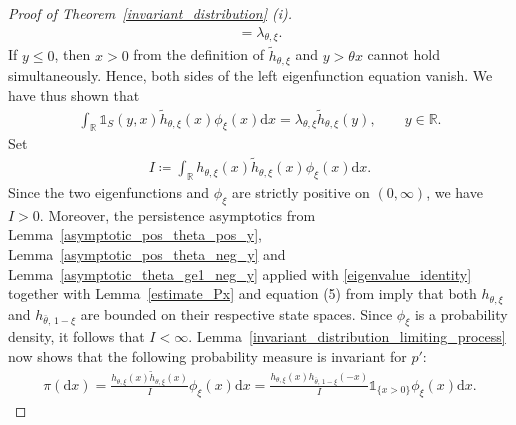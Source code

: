 \documentclass[10pt,a4paper]{amsart}
\newcommand{\R}{\mathbb{R}} %
\newcommand{\1}{\mathds{1}}
\renewcommand{\d}{\mathrm{d}}
\begin{document}
\begin{proof}[Proof of Theorem~\ref{invariant_distribution} (i)]
\begin{align}
    = \lambda_{\theta,\xi}. \label{eigenvalue_identity}
\end{align} 
If $y\leq0$, then $x>0$ from the definition of $\tilde h_{\theta,\xi}$ and $y>\theta x$ cannot hold simultaneously. Hence, both sides of the left eigenfunction equation vanish. We have thus shown that 
\begin{align*} 
    \int_\R \mathds{1}_S(y,x) \tilde h_{\theta,\xi}(x) \phi_\xi( x)\d x = \lambda_{\theta,\xi} \tilde h_{\theta,\xi}(y), \qquad y\in\R. 
\end{align*} 
Set 
\begin{align*} 
    I  \coloneqq \int_\R h_{\theta,\xi}(x) \tilde h_{\theta,\xi}(x) \phi_\xi( x)\d x. 
\end{align*}
Since the two eigenfunctions and $\phi_\xi$ are strictly positive on $(0,\infty)$, we have $I >0$. Moreover, the persistence asymptotics from Lemma~\ref{asymptotic_pos_theta_pos_y}, Lemma~\ref{asymptotic_pos_theta_neg_y} and Lemma~\ref{asymptotic_theta_ge1_neg_y} applied with \eqref{eigenvalue_identity} together with Lemma~\ref{estimate_Px} and equation (5) from \cite{AR} imply that both $h_{\theta,\xi}$ and $h_{\bar\theta,\,1-\xi}$ are bounded on their respective state spaces. Since $\phi_\xi$ is a probability density, it follows that $I <\infty$.
Lemma~\ref{invariant_distribution_limiting_process} now shows that the following probability measure is invariant for $p'$:
\begin{align*} 
    \pi (\d x) 
    = \frac{ h_{\theta,\xi}(x) \tilde h_{\theta,\xi}(x) }{ I  } \phi_\xi( x)\d x 
    = \frac{ h_{\theta,\xi}(x) h_{\bar\theta,\,1-\xi}(-x) }{ I  } \mathds{1}_{\{x>0\}} \phi_\xi( x)\d x.
\end{align*} 
 


\end{proof}
\end{document}
